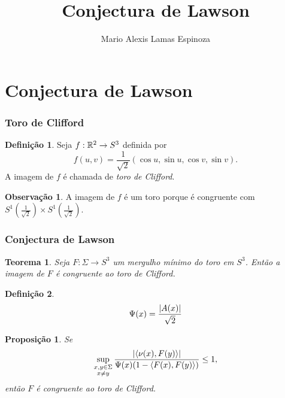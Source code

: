 \documentclass[12pt,a4paper]{beamer}
\author{Mario Alexis Lamas Espinoza}
\title{Conjectura de Lawson}
\newtheorem{teorema}{Teorema}
\newtheorem{proposicao}{Proposição}
\theoremstyle{definition}
\newtheorem{definicao}{Definição}
\newtheorem{observacao}{Observação}
\begin{document}
\begin{frame}
	\maketitle	
\end{frame}

\section{Conjectura de Lawson}

\begin{frame}
	\frametitle{Toro de Clifford}
	
	\begin{definicao}
		Seja $f: \mathbb R^2 \rightarrow S^3$ definida por
		\begin{equation*}
			f(u,v) = \frac{1}{\sqrt{2}} \left(\cos u, \sin u, \cos v, \sin v\right).
		\end{equation*}
		A imagem de $f$ é chamada de \emph{toro de Clifford}.
	\end{definicao}

	\begin{observacao}
		A imagem de $f$ é um toro porque é congruente com $S^1 \left(\frac{1}{\sqrt{2}}\right) \times S^1 \left(\frac{1}{\sqrt{2}}\right)$.
	\end{observacao}
\end{frame}

\begin{frame}
	\frametitle{Conjectura de Lawson}
	\begin{teorema}
		Seja $F: \Sigma \rightarrow S^3$ um mergulho mínimo do toro em $S^3$. Então a imagem de $F$ é congruente ao toro de Clifford.
	\end{teorema}
\end{frame}

\begin{frame}
	\begin{definicao}
		\begin{equation*}
			\Psi(x) = \frac{\left| A(x) \right|}{\sqrt{2}}
		\end{equation*}
	\end{definicao}
\end{frame}

\begin{frame}
	\begin{proposicao}
		Se
		\begin{equation*}
			\sup_{\substack{x,y \in \Sigma \\ x \neq y}} \frac{\left| \left\langle \nu(x),F(y) \right\rangle \right|}{\Psi(x) (1-\left\langle F(x),F(y) \right\rangle)} \leq 1,
		\end{equation*}
		então $F$ é congruente ao toro de Clifford.
	\end{proposicao}
\end{frame}
\end{document}

